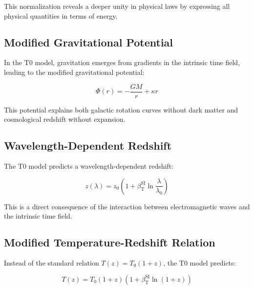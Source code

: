 \documentclass[12pt,a4paper]{article}
\newcommand{\betaT}{\beta_{\text{T}}}
\begin{document}
	This normalization reveals a deeper unity in physical laws by expressing all physical quantities in terms of energy\cite{pascher_alpha_2025}.
	
	\subsection{Modified Gravitational Potential}
	\label{subsec:modified_gravity}
	
	In the T0 model, gravitation emerges from gradients in the intrinsic time field\cite{pascher_emergente_gravitation_2025}, leading to the modified gravitational potential:
	
	\begin{equation}
		\label{eq:t0_gravity}
		\Phi(r) = -\frac{GM}{r} + \kappa r
	\end{equation}
	
	This potential explains both galactic rotation curves without dark matter\cite{pascher_galaxies_2025} and cosmological redshift without expansion\cite{pascher_messdifferenzen_2025}.
	
	\subsection{Wavelength-Dependent Redshift}
	\label{subsec:wavelength_redshift}
	
	The T0 model predicts a wavelength-dependent redshift\cite{pascher_messdifferenzen_2025}:
	
	\begin{equation}
		\label{eq:t0_redshift}
		z(\lambda) = z_0\left(1 + \betaT^{\text{SI}} \ln\frac{\lambda}{\lambda_0}\right)
	\end{equation}
	
	This is a direct consequence of the interaction between electromagnetic waves and the intrinsic time field\cite{pascher_photons_2025}.
	
	\subsection{Modified Temperature-Redshift Relation}
	\label{subsec:temp_redshift}
	
	Instead of the standard relation $T(z) = T_0(1+z)$, the T0 model predicts\cite{pascher_temp_2025}:
	
	\begin{equation}
		\label{eq:t0_temperature}
		T(z) = T_0 (1+z)(1+\betaT^{\text{SI}} \ln(1+z))
	\end{equation}
	
\end{document}
